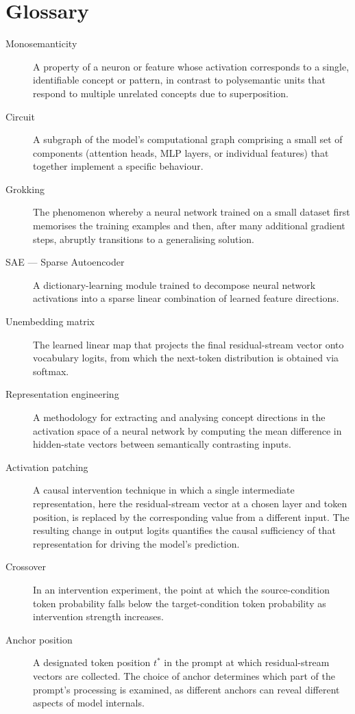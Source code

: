 \chapter*{Glossary}

\begin{description}

  \item[Monosemanticity] A property of a neuron or feature whose activation corresponds to a single, identifiable concept or pattern, in contrast to polysemantic units that respond to multiple unrelated concepts due to superposition.

  \item[Circuit] A subgraph of the model's computational graph comprising a small set of
    components (attention heads, MLP layers, or individual features) that together implement a
    specific behaviour.

  \item[Grokking] The phenomenon whereby a neural network trained on a small dataset first
    memorises the training examples and
    then, after many additional gradient steps, abruptly transitions to a generalising solution.

  \item[SAE --- Sparse Autoencoder] A dictionary-learning module trained to decompose
    neural network activations into a sparse linear combination of learned feature directions.

  \item[Unembedding matrix] The learned linear map that projects 
  the final residual-stream vector onto vocabulary logits, 
  from which the next-token distribution is obtained via softmax.

  \item[Representation engineering] A methodology for extracting and analysing concept
    directions in the activation space of a neural network by computing the mean difference
    in hidden-state vectors between semantically contrasting inputs.

  \item[Activation patching] A causal intervention technique in which a single intermediate
    representation, here the residual-stream vector at a chosen layer and token position,
    is replaced by the corresponding value from a different input.
    The resulting change in output logits quantifies the causal sufficiency of that
    representation for driving the model's prediction.

  \item[Crossover] In an intervention experiment, the point at which the source-condition token
    probability falls below the target-condition token probability as intervention strength
    increases. 
    
  \item[Anchor position] A designated token position $t^*$ in the prompt at
    which residual-stream vectors are collected.  The choice of anchor determines which part
    of the prompt's processing is examined, as different anchors can reveal
    different aspects of model internals.

\end{description}

